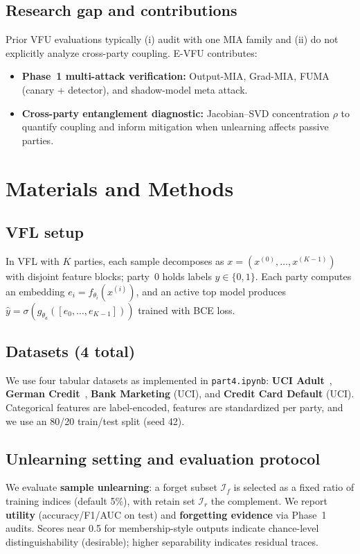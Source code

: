 \documentclass[sigconf,nonacm]{acmart}
\begin{document}
\subsection{Research gap and contributions}
Prior VFU evaluations typically (i) audit with one MIA family and (ii) do not explicitly analyze cross-party coupling. E-VFU contributes:
\begin{itemize}[leftmargin=*]
  \item \textbf{Phase~1 multi-attack verification:} Output-MIA, Grad-MIA, FUMA (canary + detector), and shadow-model meta attack.
  \item \textbf{Cross-party entanglement diagnostic:} Jacobian--SVD concentration $\rho$ to quantify coupling and inform mitigation when unlearning affects passive parties.
\end{itemize}

\section{Materials and Methods}
\subsection{VFL setup}
In VFL with $K$ parties, each sample decomposes as $x=(x^{(0)},\ldots,x^{(K-1)})$ with disjoint feature blocks; party~0 holds labels $y\in\{0,1\}$. Each party computes an embedding $e_i=f_{\theta_i}(x^{(i)})$, and an active top model produces $\hat{y}=\sigma(g_{\theta_a}([e_0,\ldots,e_{K-1}]))$ trained with BCE loss.

\subsection{Datasets (4 total)}
We use four tabular datasets as implemented in \texttt{part4.ipynb}: \textbf{UCI Adult}~\cite{kohavi1996adult}, \textbf{German Credit}~\cite{hofmann1994german}, \textbf{Bank Marketing} (UCI), and \textbf{Credit Card Default} (UCI). Categorical features are label-encoded, features are standardized per party, and we use an 80/20 train/test split (seed 42).

\subsection{Unlearning setting and evaluation protocol}
We evaluate \textbf{sample unlearning}: a forget subset $\mathcal{I}_f$ is selected as a fixed ratio of training indices (default 5\%), with retain set $\mathcal{I}_r$ the complement. We report \textbf{utility} (accuracy/F1/AUC on test) and \textbf{forgetting evidence} via Phase~1 audits. Scores near 0.5 for membership-style outputs indicate chance-level distinguishability (desirable); higher separability indicates residual traces.
\end{document}
